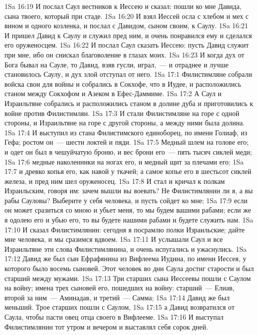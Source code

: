 \vs 1Sa 16:19 И послал Саул вестников к Иессею и сказал: пошли ко мне Давида, сына твоего, который при стаде.
\vs 1Sa 16:20 И взял Иессей осла с хлебом и мех с вином и одного козленка, и послал с Давидом, сыном своим, к Саулу.
\vs 1Sa 16:21 И пришел Давид к Саулу и служил пред ним, и очень понравился ему и сделался его оруженосцем.
\vs 1Sa 16:22 И послал Саул сказать Иессею: пусть Давид служит при мне, ибо он снискал благоволение в глазах моих.
\vs 1Sa 16:23 И когда дух от Бога бывал на Сауле, то Давид, взяв гусли, играл,~--- и отраднее и лучше становилось Саулу, и дух злой отступал от него.
\vs 1Sa 17:1 Филистимляне собрали войска свои для войны и собрались в Сокхофе, что в Иудее, и расположились станом между Сокхофом и Азеком в Ефес-Даммиме.
\vs 1Sa 17:2 А Саул и Израильтяне собрались и расположились станом в долине дуба и приготовились к войне против Филистимлян.
\vs 1Sa 17:3 И стали Филистимляне на горе с одной стороны, и Израильтяне на горе с другой стороны, а между ними была долина.
\vs 1Sa 17:4 И выступил из стана Филистимского единоборец, по имени Голиаф, из Гефа; ростом он~--- шести локтей и пяди.
\vs 1Sa 17:5 Медный шлем на голове его; и одет он был в чешуйчатую броню, и вес брони его~--- пять тысяч сиклей меди;
\vs 1Sa 17:6 медные наколенники на ногах его, и медный щит за плечами его;
\vs 1Sa 17:7 и древко копья его, как навой у ткачей; а самое копье его в шестьсот сиклей железа, и пред ним шел оруженосец.
\vs 1Sa 17:8 И стал  и кричал к полкам Израильским, говоря им: зачем вышли вы воевать? Не Филистимлянин ли я, а вы рабы Сауловы? Выберите у себя человека, и пусть сойдет ко мне;
\vs 1Sa 17:9 если он может сразиться со мною и убьет меня, то мы будем вашими рабами; если же я одолею его и убью его, то вы будете нашими рабами и будете служить нам.
\vs 1Sa 17:10 И сказал Филистимлянин: сегодня я посрамлю полки Израильские; дайте мне человека, и мы сразимся вдвоем.
\vs 1Sa 17:11 И услышали Саул и все Израильтяне эти слова Филистимлянина, и очень испугались и ужаснулись.
\rsbpar\vs 1Sa 17:12 Давид же был сын Ефрафянина из Вифлеема Иудина, по имени Иессея, у которого было восемь сыновей. Этот человек во дни Саула достиг старости и был старший между мужами.
\vs 1Sa 17:13 Три старших сына Иессеевы пошли с Саулом на войну; имена трех сыновей его, пошедших на войну: старший~--- Елиав, второй за ним~--- Аминадав, и третий~--- Самма;
\vs 1Sa 17:14 Давид же был меньший. Трое старших пошли с Саулом,
\vs 1Sa 17:15 а Давид возвратился от Саула, чтобы пасти овец отца своего в Вифлееме.
\vs 1Sa 17:16 И выступал Филистимлянин тот утром и вечером и выставлял себя сорок дней.
